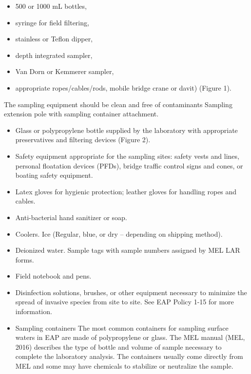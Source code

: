 \documentclass[12pt]{../SOP3_beta}\usepackage[]{graphicx}\usepackage[]{xcolor}
\begin{document}
\begin{itemize}

\item 500 or 1000 mL bottles, 
\item syringe for field filtering, 
\item stainless or Teflon dipper, 
\item depth integrated sampler, 
\item Van Dorn or Kemmerer sampler, 
\item appropriate ropes/cables/rods, mobile bridge crane or davit)  (Figure 1).  
\end{itemize}
The sampling equipment should be clean and free of contaminants
Sampling extension pole with sampling container attachment.  
\begin{itemize}



\item Glass or polypropylene bottle supplied by the laboratory with appropriate preservatives and filtering devices (Figure 2).  

\item Safety equipment appropriate for the sampling sites: safety vests and lines, personal floatation devices (PFDs), bridge traffic control signs and cones, or boating safety equipment.  

\item Latex gloves for hygienic protection; leather gloves for handling ropes and cables.  

\item Anti-bacterial hand sanitizer or soap.  

\item Coolers.  Ice (Regular, blue, or dry – depending on shipping method).  

\item Deionized water.  Sample tags with sample numbers assigned by MEL  LAR forms.  

\item Field notebook and pens.  

\item Disinfection solutions, brushes, or other equipment necessary to minimize the spread of invasive species from site to site. See EAP Policy 1-15 for more information.  

\item Sampling containers  The most common containers for sampling surface waters in EAP are made of polypropylene or glass. The MEL manual (MEL, 2016) describes the type of bottle and volume of sample necessary to complete the laboratory analysis. The containers usually come directly from MEL and some may have chemicals to stabilize or neutralize the sample. 

\end{itemize}
\end{document}

